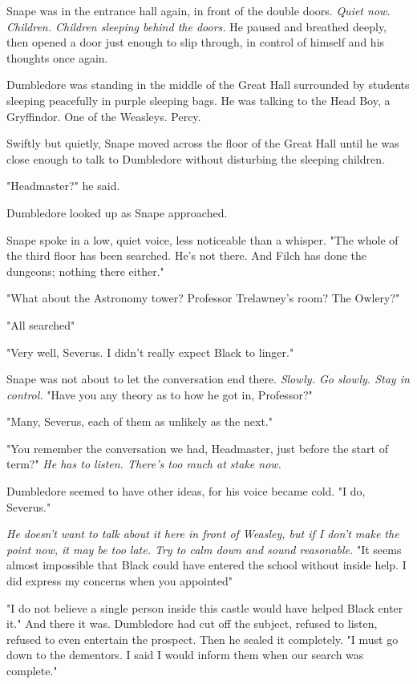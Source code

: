 Snape was in the entrance hall again, in front of the double doors. \emph{Quiet now. Children. Children sleeping behind the doors.} He paused and breathed deeply, then opened a door just enough to slip through, in control of himself and his thoughts once again.

Dumbledore was standing in the middle of the Great Hall surrounded by students sleeping peacefully in purple sleeping bags. He was talking to the Head Boy, a Gryffindor. One of the Weasleys. Percy.

Swiftly but quietly, Snape moved across the floor of the Great Hall until he was close enough to talk to Dumbledore without disturbing the sleeping children.

"Headmaster?" he said.

Dumbledore looked up as Snape approached.

Snape spoke in a low, quiet voice, less noticeable than a whisper. "The whole of the third floor has been searched. He's not there. And Filch has done the dungeons; nothing there either."

"What about the Astronomy tower? Professor Trelawney's room? The Owlery?"

"All searched{\el}"

"Very well, Severus. I didn't really expect Black to linger."

Snape was not about to let the conversation end there. \emph{Slowly. Go slowly. Stay in control.} "Have you any theory as to how he got in, Professor?"

"Many, Severus, each of them as unlikely as the next."

"You remember the conversation we had, Headmaster, just before{\el} the start of term?" \emph{He has to listen. There's too much at stake now.}

Dumbledore seemed to have other ideas, for his voice became cold. "I do, Severus."

\emph{He doesn't want to talk about it here in front of Weasley, but if I don't make the point now, it may be too late. Try to calm down and sound reasonable.} "It seems almost impossible that Black could have entered the school without inside help. I did express my concerns when you appointed{\el}"

"I do not believe a single person inside this castle would have helped Black enter it." And there it was. Dumbledore had cut off the subject, refused to listen, refused to even entertain the prospect. Then he sealed it completely. "I must go down to the dementors. I said I would inform them when our search was complete."

